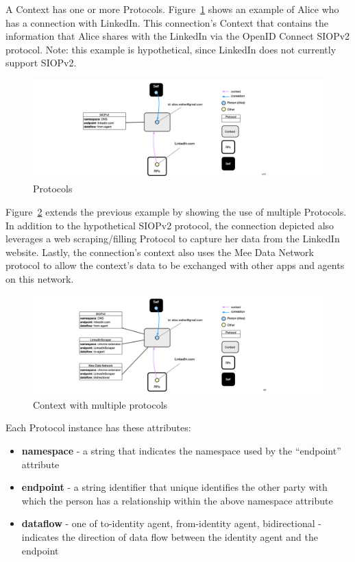\documentclass[11pt, oneside]{article}   	%
\begin{document}
A Context has one or more Protocols. Figure~\ref{fig:protocol} shows an example of Alice who has a connection with LinkedIn. This connection's Context that contains the information that Alice shares with the LinkedIn via the OpenID Connect SIOPv2 protocol. Note: this example is hypothetical, since LinkedIn does not currently support SIOPv2.

\begin{figure}[htbp]
	\includegraphics[width=\textwidth]{./images/context-with-protocol.png}
	\caption{Protocols}
	\label{fig:protocol}
\end{figure}

Figure~\ref{fig:n-protocols} extends the previous example by showing the use of multiple Protocols. In addition to the hypothetical SIOPv2 protocol, the connection depicted also leverages a web scraping/filling Protocol to capture her data from the LinkedIn website. Lastly, the connection's context also uses the Mee Data Network protocol to allow the context's data to be exchanged with other apps and agents on this  network. 

\begin{figure}[htbp]
	\includegraphics[width=\textwidth]{./images/context-with-n-protocols.png}
	\caption{Context with multiple protocols}
	\label{fig:n-protocols}
\end{figure}

Each Protocol instance has these attributes:
\begin{itemize}
\item \textbf{namespace} - a string that indicates the namespace used by the ``endpoint'' attribute
\item \textbf{endpoint} - a string identifier that unique identifies the other party with which the person has a relationship within the above namespace attribute
\item \textbf{dataflow} - one of {to-identity agent, from-identity agent, bidirectional} - indicates the direction of data flow between the identity agent and the endpoint
\end{itemize}
\end{document}
